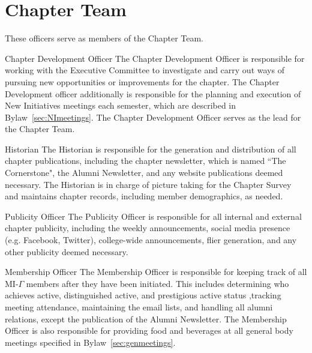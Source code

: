 \section{Chapter Team}\label{sec:ChapterTeam}
These officers serve as members of the Chapter Team.
\begin{enumsubsection}
\item{Chapter Development Officer}
The Chapter Development Officer is responsible for working with the Executive Committee to investigate and carry out ways of pursuing new opportunities or improvements for the chapter.
The Chapter Development officer additionally is responsible for the planning and execution of New Initiatives meetings each semester, which are described in Bylaw~\ref{sec:NImeetings}.
The Chapter Development Officer serves as the lead for the Chapter Team.

\item{Historian}
The Historian is responsible for the generation and distribution of all chapter publications, including the chapter newsletter, which is named ``The Cornerstone", the Alumni Newsletter, and any website publications deemed necessary.
The Historian is in charge of picture taking for the Chapter Survey and maintains chapter records, including member demographics, as needed.

\item{Publicity Officer}
The Publicity Officer is responsible for all internal and external chapter publicity, including the weekly announcements, social media presence (e.g. Facebook, Twitter), college-wide announcements, flier generation, and any other publicity deemed necessary.

\item{Membership Officer}
The Membership Officer is responsible for keeping track of all MI-$\Gamma$ members after they have been initiated.
This includes determining who achieves active, distinguished active, and prestigious active status ,tracking meeting attendance, maintaining the email lists, and handling all alumni relations, except the publication of the Alumni Newsletter.
The Membership Officer is also responsible for providing food and beverages at all general body meetings specified in Bylaw~\ref{sec:genmeetings}.
\end{enumsubsection}
%
